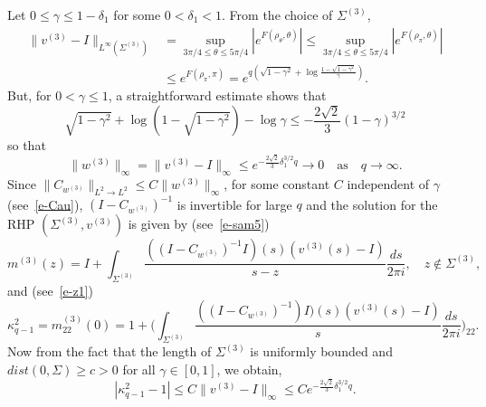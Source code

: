\documentclass{amsart}
\theoremstyle{definition}
\theoremstyle{remark}
\numberwithin{equation}{section}
\begin{document}
\bigskip
Let $0\le\gamma\le 1-\delta_1$ for some $0< \delta_1< 1$.
From the choice of $\Sigma^{(3)}$, 
\begin{equation}\label{e-sec2.13}
 \begin{split}
   \|v^{(3)}-I\|_{L^\infty(\Sigma^{(3)})} 
&=\sup_{3\pi/4 \le\theta\le 5\pi/4} |e^{F(\rho_\theta,\theta)}|
\le \sup_{3\pi/4 \le\theta\le 5\pi/4} |e^{F(\rho_{\pi},\theta)}|\\
&\le e^{F(\rho_{\pi},\pi)}
=e^{q(\sqrt{1-\gamma^2} +\log \frac{1-\sqrt{1-\gamma^2}}{\gamma})}.
 \end{split}
\end{equation}
But, for $0<\gamma \le 1$, a straightforward estimate shows that 
\begin{equation}\label{e-sec2.14}
   \sqrt{1-\gamma^2} +\log (1-\sqrt{1-\gamma^2}) -\log\gamma 
\le -\frac{2\sqrt{2}}{3} (1-\gamma)^{3/2}
\end{equation}
so that 
\begin{equation}\label{e-sec2.15}
   \|w^{(3)}\|_\infty =\|v^{(3)}-I\|_\infty
\le e^{-\frac{2\sqrt{2}}{3}\delta_1^{3/2}q} \to 0 
\quad\text{as}\quad q\to\infty.
\end{equation} 
Since $\|C_{w^{(3)}}\|_{L^2\to L^2} \le C\|w^{(3)}\|_\infty$, for 
some constant $C$ independent of $\gamma$ (see~\eqref{e-Cau}), 
$(I-C_{w^{(3)}})^{-1}$ is invertible for large $q$ and 
the solution for the RHP $(\Sigma^{(3)},v^{(3)})$ is given by 
(see~\eqref{e-sam5}) 
\begin{equation}\label{e-z2}
      m^{(3)}(z)=I+\int_{\Sigma^{(3)}} 
\frac{((I-C_{w^{(3)}})^{-1}I)(s)(v^{(3)}(s)-I)}{s-z}
\frac{ds}{2\pi i}, \quad z\notin\Sigma^{(3)},
\end{equation}
and (see~\eqref{e-z1})
\begin{equation}
   \kappa_{q-1}^2=m^{(3)}_{22}(0)
=1+\biggl( \int_{\Sigma^{(3)}} 
\frac{((I-C_{w^{(3)}})^{-1})I)(s)(v^{(3)}(s)-I)}{s}
\frac{ds}{2\pi i} \biggr)_{22}.
\end{equation}
Now from the fact that the length of $\Sigma^{(3)}$ is uniformly 
bounded and $dist(0, \Sigma) \geq c>0$ for all $\gamma\in [0,1]$, we obtain, 
\begin{equation}\label{e-sec2.18}
   |  \kappa_{q-1}^2 -1 |
\le C\|v^{(3)}-I\|_\infty
\le Ce^{-\frac{2\sqrt{2}}{3}\delta_1^{3/2}q}.
\end{equation}

\end{document}

